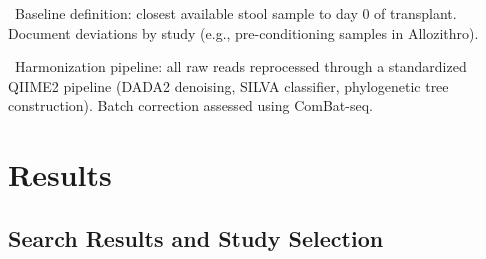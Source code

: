 \documentclass[11pt,a4paper]{article}
\newcommand{\todoitem}[1]{\textcolor{blue!70!black}{\textbullet~#1}}
\begin{document}
\todoitem{Baseline definition: closest available stool sample to day 0 of transplant. Document deviations by study (e.g., pre-conditioning samples in Allozithro).}

\todoitem{Harmonization pipeline: all raw reads reprocessed through a standardized QIIME2 pipeline (DADA2 denoising, SILVA classifier, phylogenetic tree construction). Batch correction assessed using ComBat-seq.}


\section{Results}
\label{sec:results}

\subsection{Search Results and Study Selection}
\label{sec:prisma}
\end{document}
